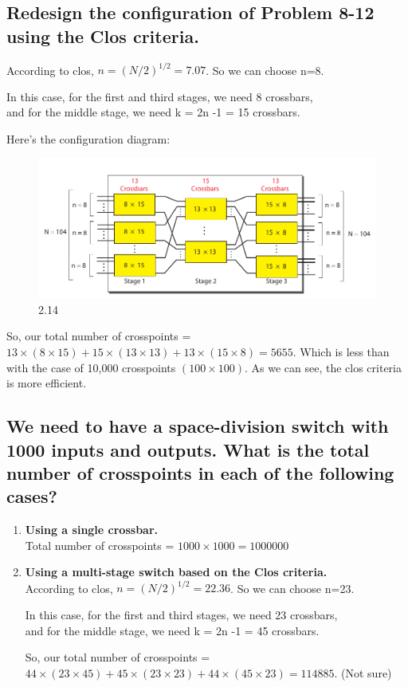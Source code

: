 \documentclass{article}
\begin{document}
\subsection{Redesign the configuration of Problem 8-12 using the Clos criteria.}
According to clos, $ n = (N / 2)^{1/2} = 7.07 $. So we can choose n=8. \par
In this case, for the first and third stages, we need 8 crossbars,\\
and for the middle stage, we need k = 2n -1 = 15 crossbars. \par
Here's the configuration diagram:
\begin{figure}[H]
	\center
	\includegraphics[scale=0.5]{8.3.png}
	\caption{2.14}
\end{figure}

So, our total number of crosspoints = $ 13 \times (8 \times 15) + 15 \times (13 \times 13) + 13 \times (15 \times 8) = 5655 $.
Which is less than with the case of 10,000 crosspoints $ (100 \times 100) $. As we can see, the clos criteria is more efficient.

\subsection{We need to have a space-division switch with 1000 inputs and outputs. What
	is the total number of crosspoints in each of the following cases?}
\begin{enumerate}
	\item \textbf{ Using a single crossbar. } \\
	      Total number of crosspoints = $ 1000 \times 1000 = 1000000 $
	\item \textbf{ Using a multi-stage switch based on the Clos criteria. } \\
	      According to clos, $ n = (N / 2)^{1/2} = 22.36 $. So we can choose n=23. \par
	      In this case, for the first and third stages, we need 23 crossbars,\\
	      and for the middle stage, we need k = 2n -1 = 45 crossbars. \par
	      So, our total number of crosspoints = $ 44 \times (23 \times 45) + 45 \times (23 \times 23) + 44 \times (45 \times 23) = 114885 $. (Not sure)
\end{enumerate}
\end{document}
